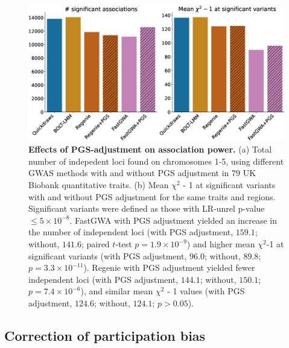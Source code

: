 \begin{figure}[h]
    \centering
    \includegraphics[width=\textwidth]{figures/fig.prs_adjustment.summary.total_loci_noCI.eps}
    \caption{\textbf{Effects of PGS-adjustment on association power.}
    (a) Total number of indepedent loci found on chromosomes 1-5, using different GWAS methods with and without PGS adjustment in $79$ UK Biobank quantitative traits.
    (b) Mean $\chi^2$ - 1 at significant variants with and without PGS adjustment for the same traits and regions.
    Significant variants were defined as those with LR-unrel p-value $\leq 5 \times 10^{-8}$.
    FastGWA with PGS adjustment yielded an increase in the number of independent loci (with PGS adjustment, $159.1$; without, $141.6$; paired $t$-test $p=1.9\times 10^{-9}$) and higher mean $\chi^2$-1 at significant variants (with PGS adjustment, $96.0$; without, $89.8$; $p=3.3\times 10^{-11}$).
    Regenie with PGS adjustment yielded fewer independent loci (with PGS adjustment, $144.1$; without, $150.1$; $p=7.4\times 10^{-6}$), and similar mean $\chi^2$ - 1 values (with PGS adjustment, $124.6$; without, $124.1$; $p>0.05$).
    }
    \label{fig:prs_adjustment}
\end{figure}

\clearpage

\subsection{Correction of participation bias}
\label{sec:ch5-ukb-parti-bias}

